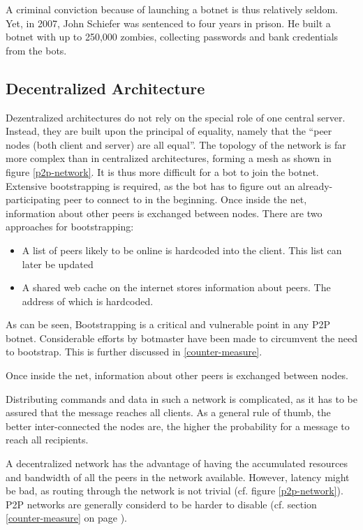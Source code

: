 \documentclass{llncs}
\begin{document}
 A criminal conviction because of launching a botnet is thus
 relatively seldom. Yet, in 2007, John Schiefer was sentenced to four
 years in prison. He built a botnet with up to 250,000 zombies,
 collecting passwords and bank credentials from the bots.\cite{BotnetCrime}

\subsection{Decentralized Architecture}
\label{decent}
Dezentralized architectures do not rely on the special role of one
central server. Instead, they are built upon the principal of
equality, namely that the ``peer nodes (both client and server) are
all equal''\cite{steggink2007detection}. The topology of the network
is far more complex than in centralized architectures, forming a mesh
as shown in figure \ref{p2p-network}. It is thus more difficult for a
bot to join the botnet. Extensive bootstrapping is required, as the
bot has to figure out an already-participating peer to connect to in the
beginning. Once inside the net, information about other peers is
exchanged between nodes. There are two approaches for bootstrapping\cite{wang2009systematic}:
\begin{itemize}
\item A list of peers likely to be online is hardcoded into the client. This list can later be updated
\item A shared web cache on the internet stores information about
  peers. The address of which is hardcoded.
\end{itemize}

As can be seen, Bootstrapping is a critical and vulnerable point in
any P2P botnet. Considerable efforts by botmaster have been made to
circumvent the need to bootstrap\cite{td1sc}. This is further
discussed in \ref{counter-measure}.

Once inside the net, information about other peers is
exchanged between nodes.

Distributing commands and data in such a network is complicated, as it
has to be assured that the message reaches all clients. As a general
rule of thumb, the better inter-connected the nodes are, the higher
the probability for a message to reach all recipients.

A decentralized network has the advantage of having the accumulated
resources and bandwidth of all the peers in the network
available. However, latency might be bad, as routing through the
network is not trivial (cf. figure \ref{p2p-network}). P2P networks
are generally considerd to be harder to disable (cf. section
\ref{counter-measure} on page \pageref{counter-measure}).
\end{document}

